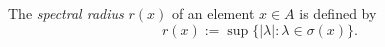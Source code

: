 The \emph{spectral radius} $r(x)$ of an element $x \in A$ is defined by
$$r(x) := \sup\{|\lambda| : \lambda \in \sigma(x)\}.$$
